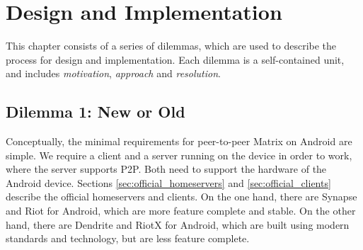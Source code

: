 \chapter{Design and Implementation}
This chapter consists of a series of dilemmas, which are used to describe the process for design and implementation.
Each dilemma is a self-contained unit, and includes \textit{motivation}, \textit{approach} and \textit{resolution}.

\section{Dilemma 1: New or Old}
Conceptually, the minimal requirements for peer-to-peer Matrix on Android are simple.
We require a client and a server running on the device in order to work, where the server supports \ac{P2P}.
Both need to support the hardware of the Android device.
Sections \ref{sec:official_homeservers} and \ref{sec:official_clients} describe the official homeservers and clients.
On the one hand, there are Synapse and Riot for Android, which are more feature complete and stable.
On the other hand, there are Dendrite and RiotX for Android, which are built using modern standards and technology, but are less feature complete.






